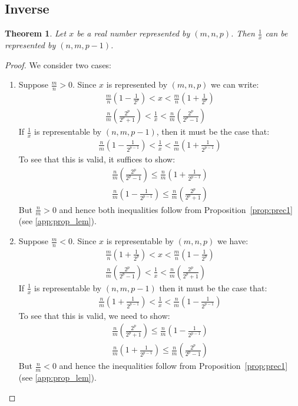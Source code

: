 \documentclass{article}
\newtheorem{mytheorem}{Theorem}
\numberwithin{mytheorem}{section}
\begin{document}
\subsection{Inverse}\label{subsec:inv}
\begin{mytheorem}\label{thm:inverse}
Let $x$ be a real number represented by $(m,n,p)$. Then $\frac{1}{x}$ can be represented by $(n,m,p-1)$.
\end{mytheorem}
\begin{proof}
We consider two cases:
\begin{enumerate}
\item
Suppose $\frac{m}{n}>0$. Since $x$ is represented by $(m,n,p)$ we can write:
\begin{align*}
\frac{m}{n}(1-\frac{1}{2^{p}})<x<\frac{m}{n}(1+\frac{1}{2^{p}})\\
\frac{n}{m}(\frac{2^{p}}{2^{p}+1})<\frac{1}{x}<\frac{n}{m}(\frac{2^{p}}{2^{p}-1})
\end{align*}
If $\frac{1}{x}$ is representable by $(n,m,p-1)$, then it must be the case that:
\begin{align*}
\frac{n}{m}(1-\frac{1}{2^{p-1}})<\frac{1}{x}<\frac{n}{m}(1+\frac{1}{2^{p-1}})
\end{align*}
To see that this is valid, it suffices to show:
\begin{align*}
\frac{n}{m}(\frac{2^{p}}{2^{p}-1})\leq \frac{n}{m}(1+\frac{1}{2^{p-1}})\\
\frac{n}{m}(1-\frac{1}{2^{p-1}})\leq \frac{n}{m}(\frac{2^{p}}{2^{p}+1})
\end{align*}
But $\frac{n}{m}>0$ and hence both inequalities follow from Proposition~\ref{prop:prec1} (see \ref{app:prop_lem}). 
\item
Suppose $\frac{m}{n}<0$. Since $x$ is representable by $(m,n,p)$ we have:
\begin{align*}
\frac{m}{n}(1+\frac{1}{2^{p}})<x<\frac{m}{n}(1-\frac{1}{2^{p}})\\
\frac{n}{m}(\frac{2^{p}}{2^{p}-1})<\frac{1}{x}<\frac{n}{m}(\frac{2^{p}}{2^{p}+1})
\end{align*}
If $\frac{1}{x}$ is representable by $(n,m,p-1)$ then it must be the case that:
\begin{align*}
\frac{n}{m}(1+\frac{1}{2^{p-1}})<\frac{1}{x}<\frac{n}{m}(1-\frac{1}{2^{p-1}})
\end{align*}
To see that this is valid, we need to show:
\begin{align*}
\frac{n}{m}(\frac{2^{p}}{2^{p}+1})\leq \frac{n}{m}(1-\frac{1}{2^{p-1}}) \\
\frac{n}{m}(1+\frac{1}{2^{p-1}})\leq \frac{n}{m}(\frac{2^{p}}{2^{p}-1})
\end{align*}
But $\frac{n}{m}<0$ and hence the inequalities follow from Proposition~\ref{prop:prec1} (see \ref{app:prop_lem}). 
\end{enumerate}
\end{proof}
\end{document}
